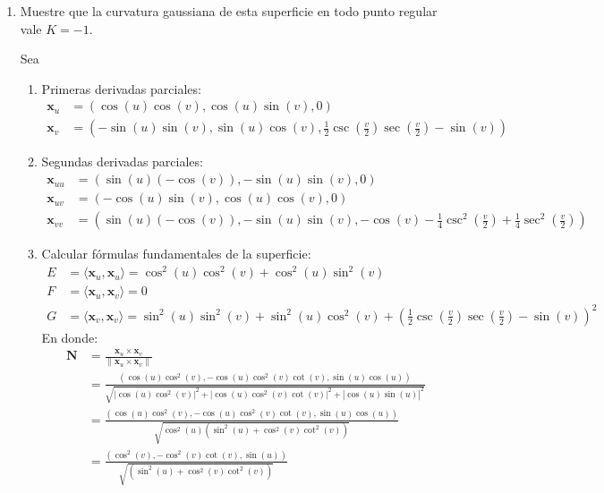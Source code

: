 \begin{problema}
\begin{enumerate}
\begin{sol}
        \end{sol}
        \item Muestre que la curvatura gaussiana de esta superficie en todo punto regular vale $K=-1$.
        \begin{sol}
            Sea 
            \begin{enumerate}
                \item Primeras derivadas parciales:
                \begin{align*}
                    \mathbf{x}_u &= \left(\cos(u)\cos(v),\cos(u)\sin(v),0\right)\\
                \mathbf{x}_v &= \left(-\sin(u)\sin(v),\sin(u)\cos(v),\frac{1}{2}\csc\left(\frac{v}{2}\right)\sec\left(\frac{v}{2}\right)-\sin(v)\right)
                \end{align*}
                \item Segundas derivadas parciales:
                \begin{align*}
                    \mathbf{x}_{uu} &= \left(\sin(u)(-\cos(v)),-\sin(u)\sin(v),0\right)\\
                \mathbf{x}_{uv} &= \left(-\cos(u)\sin(v),\cos(u)\cos(v),0\right)\\
                \mathbf{x}_{vv} &= \left(\sin(u)(-\cos(v)),-\sin(u)\sin(v),-\cos(v)-\frac{1}{4}\csc^2\left(\frac{v}{2}\right)+\frac{1}{4}\sec^2\left(\frac{v}{2}\right)\right)
                \end{align*}
                \item Calcular fórmulas fundamentales de la superficie:
                \begin{align*}
                    E &= \langle\mathbf{x}_u, \mathbf{x}_u\rangle= \cos^2(u)\cos^2(v)+\cos^2(u)\sin^2(v)\\
                    F &= \langle\mathbf{x}_u, \mathbf{x}_v\rangle= 0 \\
                    G &= \langle\mathbf{x}_v, \mathbf{x}_v\rangle=\sin^2(u)\sin^2(v)+\sin^2(u)\cos^2(v)+\left(\frac{1}{2}\csc\left(\frac{v}{2}\right)\sec\left(\frac{v}{2}\right)-\sin(v)\right)^2
                \end{align*}
                En donde:
                \begin{align*}
                    \mathbf{N} &= \frac{\mathbf{x}_u \times \mathbf{x}_v}{\|\mathbf{x}_u \times \mathbf{x}_v\|}\\
                    &= \frac{(\cos(u)\cos^2(v),-\cos(u)\cos^2(v)\cot(v),\sin(u)\cos(u))}{\sqrt{\left|\cos(u)\cos^2(v)\right|^2+\left|\cos(u)\cos^2(v)\cot(v)\right|^2+|\cos(u)\sin(u)|^2}}\\
                    &= \frac{(\cos(u)\cos^2(v),-\cos(u)\cos^2(v)\cot(v),\sin(u)\cos(u))}{\sqrt{\cos^2(u)\left(\sin^2(u)+\cos^2(v)\cot^2(v)\right)}}\\
                    &= \frac{(\cos^2(v),-\cos^2(v)\cot(v),\sin(u))}{\sqrt{\left(\sin^2(u)+\cos^2(v)\cot^2(v)\right)}}\\
                \end{align*}
                

\end{enumerate}
\end{sol}
\end{enumerate}
\end{problema}
